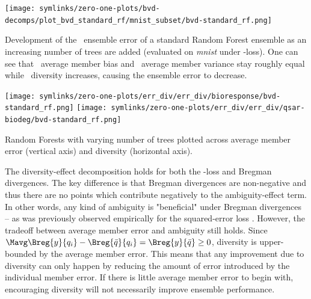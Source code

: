 \documentclass[
	twoside=false, %
]{kaobook}
\begin{document}
\begin{marginfigure}
  \texttt{[image: symlinks/zero-one-plots/bvd-decomps/plot\_bvd\_standard\_rf/mnist\_subset/bvd-standard\_rf.png]}
  \caption{
    Development of the \ensembleErrorCircle~ensemble error of a standard Random Forest ensemble as an increasing number of trees are added (evaluated on \textit{mnist} under \zeroone-loss). One can see that \avgBiasCircle~average member bias and \avgVarianceCircle~average member variance stay roughly equal while \diversityCircle~diversity increases, causing the ensemble error to decrease.
  }
  \label{fig:err_div}
\end{marginfigure}
\begin{marginfigure}
\texttt{[image: symlinks/zero-one-plots/err\_div/err\_div/bioresponse/bvd-standard\_rf.png]}
\texttt{[image: symlinks/zero-one-plots/err\_div/err\_div/qsar-biodeg/bvd-standard\_rf.png]}
\caption{
  Random Forests with varying number of trees plotted across average member error (vertical axis) and diversity (horizontal axis). 
}
\end{marginfigure}

The diversity-effect decomposition holds for both the \zeroone-loss and Bregman divergences. The key difference is that Bregman divergences are non-negative and thus there are no points which contribute negatively to the ambiguity-effect term. In other words, any kind of ambiguity is "beneficial" under Bregman divergences -- as was previously observed empirically for the squared-error loss \cite{abe_PathologiesPredictiveDiversity_2023}.
However, the tradeoff between average member error and ambiguity still holds. Since 
$ \Mavg \Breg{y}{q_{i}} - \Breg{\bar{q}}{q_{i}} = \Breg{y}{\bar{q}} \geq 0$, 
diversity is upper-bounded by the average member error. This means that any improvement due to diversity can only happen by reducing the amount of error introduced by the individual member error. If there is little average member error to begin with, encouraging diversity will not necessarily improve ensemble performance. 
\end{document}
